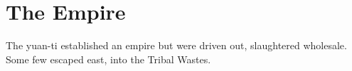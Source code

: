 \section{The Empire}

The yuan-ti established an empire but were driven out, slaughtered wholesale.
Some few escaped east, into the Tribal Wastes.

